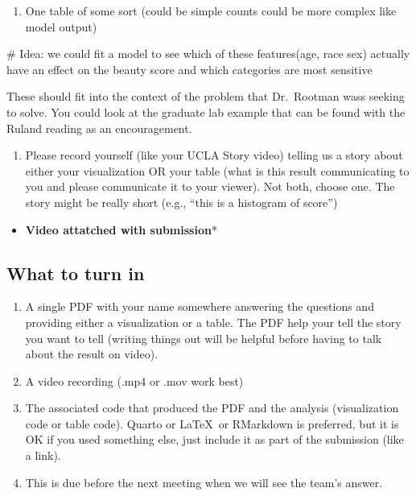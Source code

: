 \documentclass[
  letterpaper,
  DIV=11,
  numbers=noendperiod]{scrartcl}
\newenvironment{Shaded}{\begin{snugshade}}{\end{snugshade}}
\newcommand{\CommentTok}[1]{\textcolor[rgb]{0.37,0.37,0.37}{#1}}
\providecommand{\tightlist}{%
  \setlength{\itemsep}{0pt}\setlength{\parskip}{0pt}}\usepackage{longtable,booktabs,array}
\begin{document}
\begin{enumerate}
\def\labelenumi{\arabic{enumi}.}
\setcounter{enumi}{1}
\tightlist
\item
  One table of some sort (could be simple counts could be more complex
  like model output)
\end{enumerate}

\begin{Shaded}
\begin{Highlighting}[]
\CommentTok{\# Idea: we could fit a model to see which of these features(age, race sex) actually have an effect on the beauty score and which categories are most sensitive }
\end{Highlighting}
\end{Shaded}

These should fit into the context of the problem that Dr.~Rootman wass
seeking to solve. You could look at the graduate lab example that can be
found with the Ruland reading as an encouragement.

\begin{enumerate}
\def\labelenumi{\arabic{enumi}.}
\setcounter{enumi}{2}
\tightlist
\item
  Please record yourself (like your UCLA Story video) telling us a story
  about either your visualization OR your table (what is this result
  communicating to you and please communicate it to your viewer). Not
  both, choose one. The story might be really short (e.g., ``this is a
  histogram of score'')
\end{enumerate}

\begin{itemize}
\tightlist
\item
  \textbf{Video attatched with submission}*
\end{itemize}

\subsection{What to turn in}\label{what-to-turn-in}

\begin{enumerate}
\def\labelenumi{\arabic{enumi}.}
\tightlist
\item
  A single PDF with your name somewhere answering the questions and
  providing either a visualization or a table. The PDF help your tell
  the story you want to tell (writing things out will be helpful before
  having to talk about the result on video).
\item
  A video recording (.mp4 or .mov work best)
\item
  The associated code that produced the PDF and the analysis
  (visualization code or table code). Quarto or \LaTeX~or RMarkdown is
  preferred, but it is OK if you used something else, just include it as
  part of the submission (like a link).
\item
  This is due before the next meeting when we will see the team's
  answer.
\end{enumerate}
\end{document}

